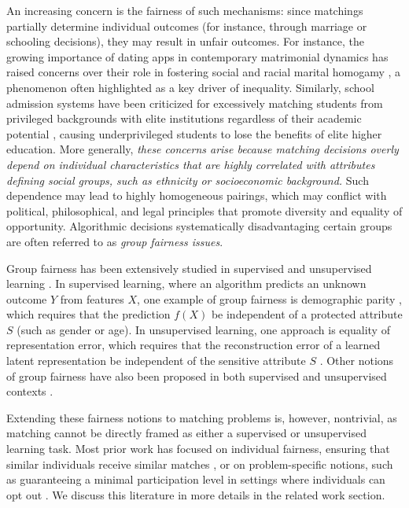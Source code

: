\documentclass{article}
\theoremstyle{definition}
\begin{document}
An increasing concern is the fairness of such mechanisms: since matchings partially determine individual outcomes (for instance, through marriage or schooling decisions), they may result in unfair outcomes. For instance, the growing importance of dating apps in contemporary matrimonial dynamics has raised concerns over their role in fostering social and racial marital homogamy \citep{piketty2013capital,zheng2018fairness,jia2018online,zhao2024leveraging}, a phenomenon often highlighted as a key driver of inequality. Similarly, school admission systems have been criticized for excessively matching students from privileged backgrounds with elite institutions regardless of their academic potential \citep{hiller2012choix,fack2014impact,simioni2022comment}, causing underprivileged students to lose the benefits of elite higher education. More generally, \textit{these concerns arise because matching decisions overly depend on individual characteristics that are highly correlated with attributes defining social groups, such as ethnicity or socioeconomic background.} Such dependence may lead to highly homogeneous pairings, which may conflict with political, philosophical, and legal principles that promote diversity and equality of opportunity. Algorithmic decisions systematically disadvantaging certain groups are often referred to as \textit{group fairness issues}.

Group fairness has been extensively studied in supervised and unsupervised learning \citep{barocas-hardt-narayanan}. In supervised learning, where an algorithm predicts an unknown outcome $Y$ from features $X$, one example of group fairness is demographic parity \cite{calders2009building}, which requires that the prediction $f(X)$ be independent of a protected attribute $S$ (such as gender or age). 
In unsupervised learning, one approach is equality of representation error, which requires that the reconstruction error of a learned latent representation be independent of the sensitive attribute $S$ \citep{samadi2018price}.
Other notions of group fairness have also been proposed in both supervised and unsupervised contexts \citep{barocas-hardt-narayanan}.

Extending these fairness notions to matching problems is, however, nontrivial, as matching cannot be directly framed as either a supervised or unsupervised learning task. Most prior work has focused on individual fairness, ensuring that similar individuals receive similar matches \citep{devic2023fairness}, or on problem-specific notions, such as guaranteeing a minimal participation level in settings where individuals can opt out \citep{ashlagi2014free}. We discuss this literature in more details in the related work section.
\end{document}
